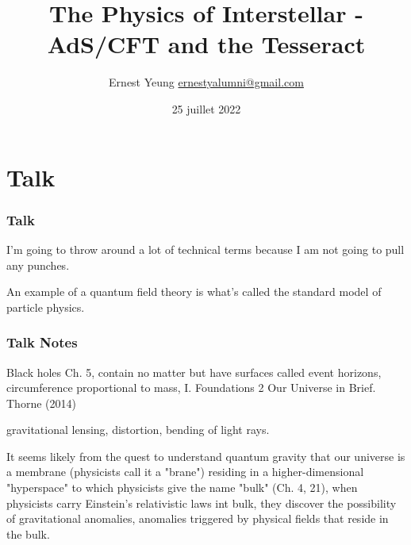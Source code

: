 \documentclass[10pt]{amsart}
\title{The Physics of Interstellar - AdS/CFT and the Tesseract}
\author{Ernest Yeung \href{mailto:ernestyalumni@gmail.com}{ernestyalumni@gmail.com}}
\date{25 juillet 2022}
\begin{document}
	
	
	\maketitle
	
	\begin{multicols*}{2}
		
		\setcounter{tocdepth}{1}
		\tableofcontents
		
		\begin{abstract}
						
		\end{abstract}
		
		\part{}


\end{multicols*}

\part{Talk}

\section{Talk}

I'm going to throw around a lot of technical terms because I am not going to pull any punches.

An example of a quantum field theory is what's called the standard model of particle physics. 



\section{Talk Notes}

Black holes Ch. 5, contain no matter but have surfaces called event horizons, circumference proportional to mass, I. Foundations 2 Our Universe in Brief. Thorne (2014) \cite{Thor2014}

gravitational lensing, distortion, bending of light rays.

It seems likely from the quest to understand quantum gravity that our universe is a membrane (physicists call it a "brane") residing in a higher-dimensional "hyperspace" to which physicists give the name "bulk" (Ch. 4, 21), when physicists carry Einstein's relativistic laws int bulk, they discover the possibility of gravitational anomalies, anomalies triggered by physical fields that reside in the bulk.
\end{document}
